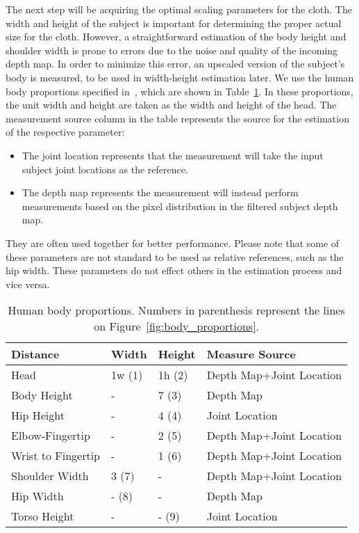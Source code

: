 The next step will be acquiring the optimal scaling parameters for the cloth. The width and height of the subject is important for determining the proper actual size for the cloth. However, a straightforward estimation of the body height and shoulder width is prone to errors due to the noise and quality of the incoming depth map. In order to minimize this error, an upscaled version of the subject's body is measured, to be used in width-height estimation later. We use the human body proportions specified in~\cite{Willis2012}, which are shown in Table~\ref{tbl:human_body_proportions}. In these proportions, the unit width and height are taken as the width and height of the head. The measurement source column in the table represents the source for the estimation of the respective parameter:
\begin{itemize} 
\item
The joint location represents that the measurement will take the input subject joint locations as the reference.
\item 
The depth map represents the measurement will instead perform measurements based on the pixel distribution in the filtered subject depth map. 
\end{itemize}
They are often used together for better performance. Please note that some of these parameters are not standard to be used as relative references, such as the hip width. These parameters do not effect others in the estimation process and vice versa.

\begin{table}
\center
\begin{tabular}{ | l | l | l | l |}
\hline
\textbf{Distance} & \textbf{Width} & \textbf{Height} & \textbf{Measure Source} \\ \hline
Head & 1w (1) & 1h (2) & Depth Map+Joint Location \\ \hline
Body Height & - & 7 (3) & Depth Map \\ \hline
Hip Height & - & 4 (4) & Joint Location \\ \hline
Elbow-Fingertip & - & 2 (5) & Depth Map+Joint Location \\ \hline
Wrist to Fingertip & - & 1 (6) & Depth Map+Joint Location \\ \hline
Shoulder Width & 3 (7) & - & Depth Map+Joint Location \\ \hline
Hip Width & - (8) & - & Depth Map \\ \hline
Torso Height & - & - (9) & Joint Location \\ 
\hline
\end{tabular}
\caption{Human body proportions. Numbers in parenthesis represent the lines on Figure~\ref{fig:body_proportions}.}
\label{tbl:human_body_proportions}
\end{table}


